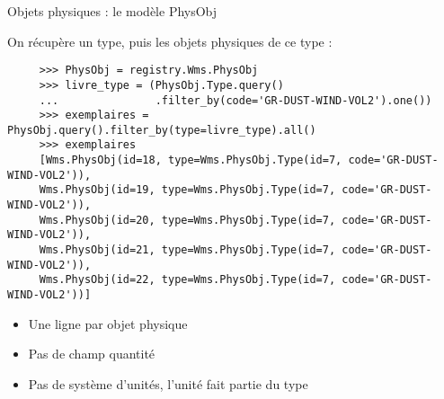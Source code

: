 \documentclass{beamer}
\begin{document}
\begin{frame}[fragile]{Objets physiques : le modèle PhysObj}

On récupère un type, puis les objets physiques de ce type :
\begin{verbatim}
     >>> PhysObj = registry.Wms.PhysObj
     >>> livre_type = (PhysObj.Type.query()
     ...               .filter_by(code='GR-DUST-WIND-VOL2').one())
     >>> exemplaires = PhysObj.query().filter_by(type=livre_type).all()
     >>> exemplaires
     [Wms.PhysObj(id=18, type=Wms.PhysObj.Type(id=7, code='GR-DUST-WIND-VOL2')),
     Wms.PhysObj(id=19, type=Wms.PhysObj.Type(id=7, code='GR-DUST-WIND-VOL2')),
     Wms.PhysObj(id=20, type=Wms.PhysObj.Type(id=7, code='GR-DUST-WIND-VOL2')),
     Wms.PhysObj(id=21, type=Wms.PhysObj.Type(id=7, code='GR-DUST-WIND-VOL2')),
     Wms.PhysObj(id=22, type=Wms.PhysObj.Type(id=7, code='GR-DUST-WIND-VOL2'))]
\end{verbatim}

\begin{itemize}
  \item<2-> Une ligne par objet physique
  \item<3-> Pas de champ quantité
  \item<4-> Pas de système d'unités, l'unité fait partie du type
\end{itemize}
\end{frame}
\end{document}
